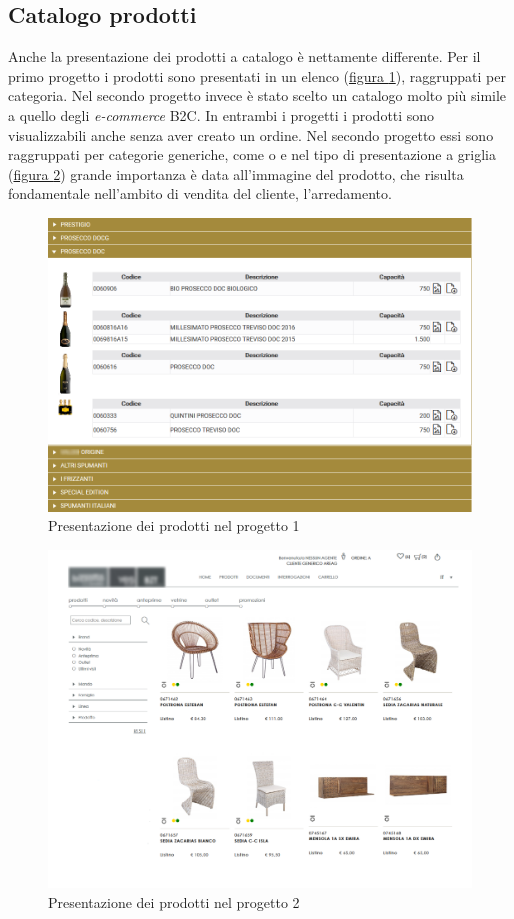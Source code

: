 \subsection{Catalogo prodotti}
Anche la presentazione dei prodotti a catalogo è nettamente differente. Per il primo progetto i prodotti sono presentati in un elenco (\hyperref[fig:catalogo-1]{figura \ref{fig:catalogo-1}}), raggruppati per categoria. Nel secondo progetto invece è stato scelto un catalogo molto più simile a quello degli \textit{e-commerce} B2C. In entrambi i progetti i prodotti sono visualizzabili anche senza aver creato un ordine. Nel secondo progetto essi sono raggruppati per categorie generiche, come  o e nel tipo di presentazione a griglia (\hyperref[fig:catalogo-2]{figura \ref{fig:catalogo-2}}) grande importanza è data all'immagine del prodotto, che risulta fondamentale nell'ambito di vendita del cliente, l'arredamento.
\begin{figure}[H]
	\centering
	\includegraphics[width=\linewidth]{Immagini/p1/catalogo.png}
	\caption{Presentazione dei prodotti nel progetto 1}
	\label{fig:catalogo-1}
\end{figure}
\begin{figure}[H]
	\centering
	\includegraphics[width=\linewidth]{Immagini/p2/catalogo.png}
	\caption{Presentazione dei prodotti nel progetto 2}
	\label{fig:catalogo-2}
\end{figure}

